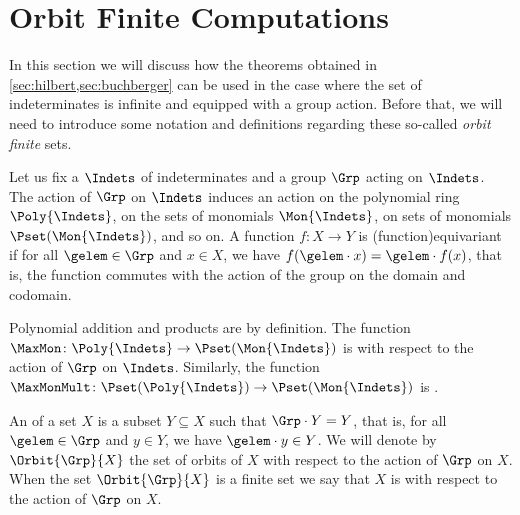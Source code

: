\section{Orbit Finite Computations}
\label{sec:orbit-finite-computations}

In this section we will discuss how the theorems obtained in
\cref{sec:hilbert,sec:buchberger}
can
be used in the case where the set of indeterminates is infinite and equipped
with a group action. Before that, we will need to introduce some notation and
definitions regarding these so-called \emph{orbit finite} sets.

\AP Let us fix a $\Indets$ of indeterminates and a group $\Grp$ acting on
$\Indets$. The action of $\Grp$ on $\Indets$ induces an action on the
polynomial ring $\Poly{\Indets}$, on the sets of monomials $\Mon{\Indets}$, on
sets of monomials $\Pset(\Mon{\Indets})$, and so on. A function $f \colon X \to Y$ is
\intro(function){equivariant} if for all $\gelem \in \Grp$ and $x \in X$, we have $f(\gelem \cdot
x) = \gelem \cdot f(x)$, that is, the function commutes with the action of the group
on the domain and codomain.

\begin{example}
  \label{ex:equivariant}
  Polynomial addition and products are  by definition.
  The function $\MaxMon \colon \Poly{\Indets} \to \Pset(\Mon{\Indets})$
  is  with respect to the action of $\Grp$ on
  $\Indets$. 
  Similarly, the function $\MaxMonMult \colon \Pset(\Poly{\Indets}) \to
  \Pset(\Mon{\Indets})$ is .
\end{example}

\AP An  of a set $X$ is a subset $Y \subseteq X$ such
that $\Grp \cdot Y = Y$, that is, for all $\gelem \in \Grp$ and $y \in Y$, we have
$\gelem \cdot y \in Y$. We will denote by $\Orbit{\Grp}{X}$ the set of orbits of $X$
with respect to the action of $\Grp$ on $X$. When the set $\Orbit{\Grp}{X}$ is
a finite set we say that $X$ is  with respect to the action
of $\Grp$ on $X$.




